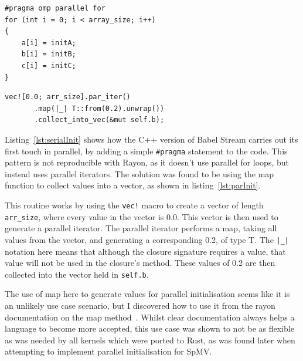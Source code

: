 \noindent\begin{minipage}{.49\textwidth}
\begin{code}
\begin{verbatim}
#pragma omp parallel for
for (int i = 0; i < array_size; i++)
{
    a[i] = initA;
    b[i] = initB;
    c[i] = initC;
}
\end{verbatim}
\label{lst:serialInit}
\end{code}
\end{minipage}\hfill
\begin{minipage}{.49\textwidth}
\begin{code}
\begin{verbatim}
vec![0.0; arr_size].par_iter()
       .map(|_| T::from(0.2).unwrap())
       .collect_into_vec(&mut self.b);
\end{verbatim}
\label{lst:parInit}
\end{code}
\end{minipage}

Listing~\ref{lst:serialInit} shows how the C++ version of Babel Stream carries out its first touch in parallel, by adding a simple \texttt{\#pragma} statement to the code. This pattern is not reproducible with Rayon, as it doesn't use parallel for loops, but instead uses parallel iterators. The solution was found to be using the map function to collect values into a vector, as shown in listing~\ref{lst:parInit}.

This routine works by using the \texttt{vec!} macro to create a vector of length \texttt{arr\_size}, where every value in the vector is 0.0. This vector is then used to generate a parallel iterator. The parallel iterator performs a map, taking all values from the vector, and generating a corresponding 0.2, of type T. The \texttt{|\_|} notation here means that although the closure signature requires a value, that value will not be used in the closure's method.
These values of 0.2 are then collected into the vector held in \texttt{self.b}.

The use of map here to generate values for parallel initialisation seems like it is an unlikely use case scenario, but I discovered how to use it from the rayon documentation on the map method~\cite{rayonMap}. Whilst clear documentation always helps a language to become more accepted, this use case was shown to not be as flexible as was needed by all kernels which were ported to Rust, as was found later when attempting to implement parallel initialisation for SpMV.

